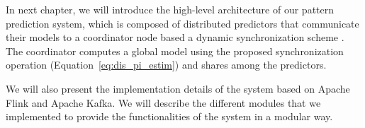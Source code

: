  \par In next chapter, we will introduce the high-level architecture of our pattern prediction system, which is composed of distributed \pmcmr predictors \cite{alevizos2017event} that communicate their models to a coordinator node based a dynamic synchronization scheme \cite{kamp2014communication}. The coordinator computes a global model using the proposed synchronization operation (Equation~\ref{eq:dis_pi_estim}) and shares among the predictors.
 
 \par We will also present the implementation details of the system based on Apache Flink and Apache Kafka. We will describe the different modules  that we implemented to provide the functionalities of the system in a modular way.
 
 